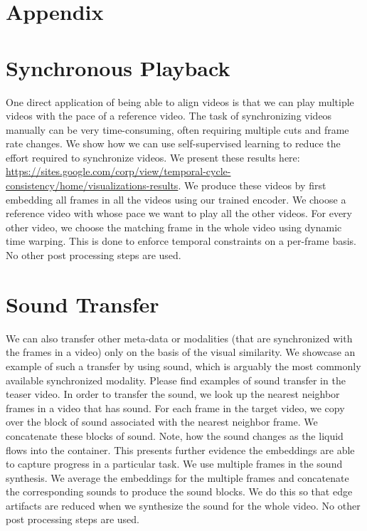 \documentclass[10pt,twocolumn,letterpaper]{article}
\begin{document}
{\small


}

\clearpage
\appendix

\section*{Appendix}
\section{Synchronous Playback}
One direct application of being able to align videos is that we can play multiple videos with the pace of a reference video. The task of synchronizing videos manually can be very time-consuming, often requiring multiple cuts and frame rate changes. We show how we can use self-supervised learning to reduce the effort required to synchronize videos. We present these results here: \url{https://sites.google.com/corp/view/temporal-cycle-consistency/home/visualizations-results}. We produce these videos by first embedding all frames in all the videos using our trained encoder. We choose a reference video with whose pace we want to play all the other videos. For every other video, we choose the matching frame in the whole video using dynamic time warping. This is done to enforce temporal constraints on a per-frame basis. No other post processing steps are used. 

\section{Sound Transfer}
We can also transfer other meta-data or modalities (that are synchronized with the frames in a video) only on the basis of the visual similarity. We showcase an example of such a transfer by using sound, which is arguably the most commonly available synchronized modality. Please find examples of sound transfer in the teaser video. In order to transfer the sound, we look up the nearest neighbor frames in a video that has sound. For each frame in the target video, we copy over the block of sound associated with the nearest neighbor frame. We concatenate these blocks of sound. Note, how the sound changes as the liquid flows into the container. This presents further evidence the embeddings are able to capture progress in a particular task. We use multiple frames in the sound synthesis. We average the embeddings for the multiple frames and concatenate the corresponding sounds to produce the sound blocks. We do this so that edge artifacts are reduced when we synthesize the sound for the whole video. No other post processing steps are used.
\end{document}
